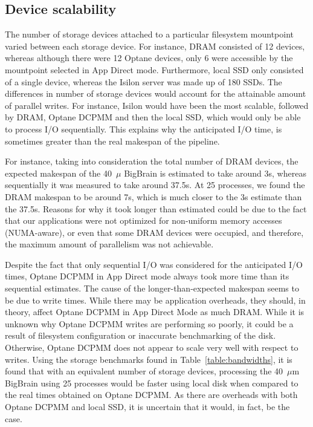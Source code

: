 \documentclass[conference]{IEEEtran}
\newcommand{\bigbrain}{BigBrain\xspace}
\begin{document}
\subsection{Device scalability}
The number of storage devices attached to a particular filesystem mountpoint varied between
each storage device. For instance, DRAM consisted of 12 devices, whereas although there were 
12 Optane devices, only 6 were accessible by the mountpoint selected in App Direct mode. Furthermore,
local SSD only consisted of a single device, whereas the Isilon server was made up of 180 SSDs. The differences
in number of storage devices would account for the attainable amount of parallel writes. For instance, 
Isilon would have been the most scalable, followed by DRAM, Optane DCPMM and then the local SSD, which would
only be able to process I/O sequentially. This explains why the anticipated I/O time, is sometimes greater
than the real makespan of the pipeline.

For instance, taking into consideration the total number of DRAM devices, the expected makespan of the
40~$\mu$ \bigbrain is estimated to take around 3s, whereas sequentially it was measured to take
around 37.5s. At 25 processes, we found the DRAM makespan to be around 7s, which is much closer to the 3s
estimate than the 37.5s. Reasons for why it took longer than estimated could be due to the fact that
our applications were not optimized for non-uniform memory accesses (NUMA-aware), or even that some DRAM devices were occupied, and therefore, the maximum amount of parallelism 
was not achievable. 

Despite the fact that only sequential I/O was considered for the anticipated I/O times, 
Optane DCPMM in App Direct mode always took more time than its sequential estimates. The cause
of the longer-than-expected makespan seems to be due to write times. While there may be application overheads,
they should, in theory, affect Optane DCPMM in App Direct Mode as much DRAM. While it is unknown
why Optane DCPMM writes are performing so poorly, it could be a result of filesystem configuration or 
inaccurate benchmarking of the disk. Otherwise, Optane DCPMM does not appear to scale very well with respect to
writes. Using the storage benchmarks found in Table~\ref{table:bandwidths}, it is found that with an equivalent
number of storage devices, processing the 40~$\mu$m \bigbrain using 25 processes would be faster using
local disk when compared to the real times obtained on Optane DCPMM. As there are overheads with both Optane DCPMM and local
SSD, it is uncertain that it would, in fact, be the case.
\end{document}
